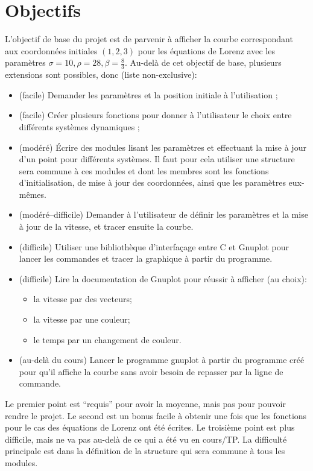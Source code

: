 \documentclass[a4paper]{article}
\begin{document}
\section{Objectifs}

L'objectif de base du projet est de parvenir {\`a} afficher la courbe
correspondant aux coordonn{\'e}es initiales $(1,2,3)$ pour les {\'e}quations
de Lorenz avec les param{\`e}tres $\sigma=10, \rho=28, \beta=\frac
83$. Au-del{\`a} de cet objectif de base, plusieurs extensions sont
possibles, donc (liste non-exclusive):
\begin{itemize}
\item (facile) Demander les param{\`e}tres et la position initiale {\`a}
  l'utilisation ;
\item (facile) Cr{\'e}er plusieurs fonctions pour donner {\`a} l'utilisateur
  le choix entre diff{\'e}rents syst{\`e}mes dynamiques ;
\item (mod{\'e}r{\'e}) {\'E}crire des modules lisant les param{\`e}tres et effectuant
  la mise {\`a} jour d'un point pour diff{\'e}rents syst{\`e}mes. Il faut pour
  cela utiliser une structure sera commune {\`a} ces modules et dont les
  membres sont les fonctions d'initialisation, de mise {\`a} jour des
  coordonn{\'e}es, ainsi que les param{\`e}tres eux-m{\^e}mes.
\item (mod{\'e}r{\'e}--difficile) Demander {\`a} l'utilisateur de d{\'e}finir les
  param{\`e}tres et la mise {\`a} jour de la vitesse, et tracer ensuite la
  courbe.
\item (difficile) Utiliser une biblioth{\`e}que d'interfa{\c c}age entre C et
  Gnuplot pour lancer les commandes et tracer la graphique {\`a} partir du
  programme.
\item (difficile) Lire la documentation de Gnuplot pour r{\'e}ussir {\`a}
  afficher (au choix):
  \begin{itemize}
  \item la vitesse par des vecteurs;
  \item la vitesse par une couleur;
  \item le temps par un changement de couleur.
  \end{itemize}
\item (au-del{\`a} du cours) Lancer le programme gnuplot {\`a}
  partir du programme cr{\'e}{\'e} pour qu'il affiche la courbe sans avoir
  besoin de repasser par la ligne de commande.
\end{itemize}
Le premier point est ``requis'' pour avoir la moyenne, mais pas pour
pouvoir rendre le projet. Le second est un bonus facile {\`a} obtenir une
fois que les fonctions pour le cas des {\'e}quations de Lorenz ont {\'e}t{\'e}
{\'e}crites. Le troisi{\`e}me point est plus difficile, mais ne va pas au-del{\`a}
de ce qui a {\'e}t{\'e} vu en cours/TP. La difficult{\'e} principale est dans la
d{\'e}finition de la structure qui sera commune {\`a} tous les modules.
\end{document}
